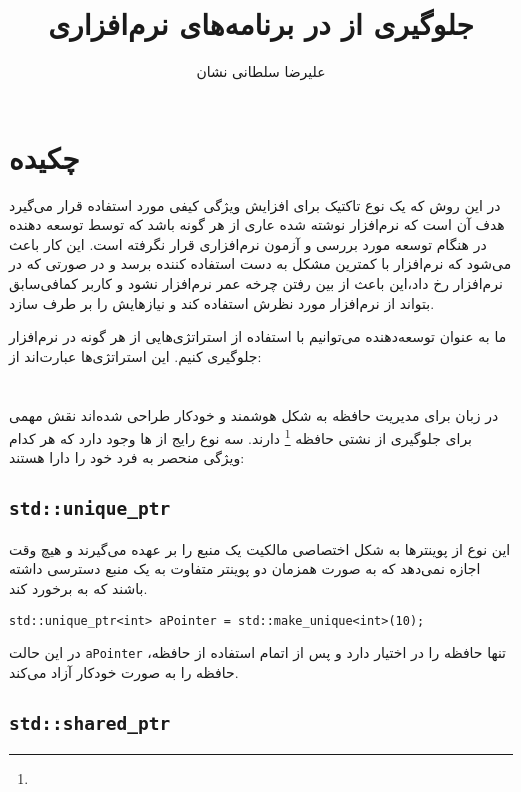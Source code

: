 \documentclass[a4paper]{article}
\title{جلوگیری از \lr{Exceptions} در برنامه‌های نرم‌افزاری}
\author{علیرضا سلطانی نشان}
\begin{document}
\maketitle

\section{چکیده}

در این روش که یک نوع تاکتیک برای افزایش ویژگی کیفی  مورد
استفاده قرار می‌گیرد هدف آن است که نرم‌افزار نوشته شده عاری از هر گونه
 باشد که توسط توسعه دهنده‌ در هنگام توسعه مورد بررسی و آزمون
نرم‌افزاری قرار نگرفته است. این کار باعث می‌شود که نرم‌افزار با کمترین مشکل به
دست استفاده کننده برسد و در صورتی که  در نرم‌افزار رخ داد،‌این
 باعث از بین رفتن چرخه عمر نرم‌افزار نشود و کاربر کمافی‌سابق بتواند از
نرم‌افزار مورد نظرش استفاده کند و نیاز‌هایش را بر طرف سازد.

ما به عنوان توسعه‌دهنده می‌توانیم با استفاده از استراتژی‌هایی از هر گونه
 در نرم‌افزار جلوگیری کنیم. این استراتژی‌ها عبارت‌اند از:

\section{}

در زبان  برای مدیریت حافظه به شکل هوشمند و خودکار طراحی شده‌اند نقش مهمی
برای جلوگیری از نشتی حافظه \footnote{} دارند. سه نوع رایج از
ها وجود دارد که هر کدام ویژگی منحصر به فرد خود را دارا هستند:

\subsection{\texttt{\large std::unique\_ptr}}

این نوع از پوینتر‌ها به شکل اختصاصی مالکیت یک منبع را بر عهده می‌گیرند و هیچ وقت
اجازه نمی‌دهد که به صورت همزمان دو پوینتر متفاوت به یک منبع دسترسی داشته باشند
که به  برخورد کند.

\begin{LTR}
    \texttt{std::unique\_ptr<int> aPointer = std::make\_unique<int>(10);}
\end{LTR}

در این حالت \texttt{\large aPointer} تنها حافظه را در اختیار دارد و پس از
اتمام استفاده از حافظه، حافظه را به صورت خودکار آزاد می‌کند.

\subsection{\texttt{\large std::shared\_ptr}}
\end{document}

